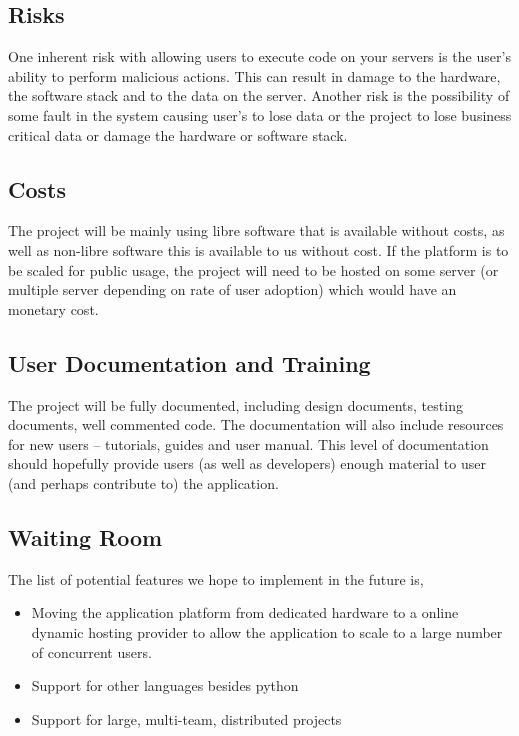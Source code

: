 \documentclass[12pt, titlepage]{article}
\begin{document}
  \subsection{Risks}
  One inherent risk with allowing users to execute code on your servers is the
  user's ability to perform malicious actions. This can result in damage to the
  hardware, the software stack and to the data on the server.  Another risk is
  the possibility of some fault in the system causing user's to lose data or
  the project to lose business critical data or damage the hardware or software
  stack.

  \subsection{Costs}
  The project will be mainly using libre software that
  is available without costs, as well as non-libre software this is available
  to us without cost. If the platform is to be scaled for public usage, the
  project will need to be hosted on some server (or multiple server depending
  on rate of user adoption) which would have an monetary cost.

  \subsection{User Documentation and Training}
	The project will be fully documented, including design documents, testing
	documents, well commented code. The documentation will also include resources
	for new users -- tutorials, guides and user manual. This level of
	documentation should hopefully provide users (as well as developers) enough
	material to user (and perhaps contribute to) the application.

  \subsection{Waiting Room}
	The list of potential features we hope to implement in the future is,
	\begin{itemize}
		\item Moving the application platform from dedicated hardware to a online
			dynamic hosting provider to allow the application to scale to a large
			number of concurrent users.
		\item Support for other languages besides python
		\item Support for large, multi-team, distributed projects
	\end{itemize}
\end{document}
